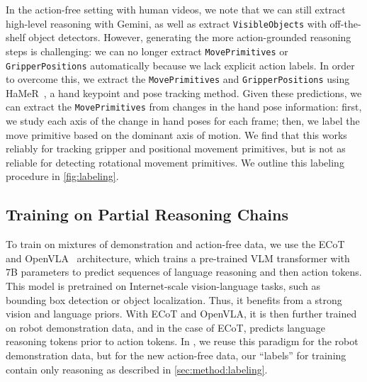 In the action-free setting with human videos, we note that we can still extract high-level reasoning with Gemini, as well as extract \texttt{VisibleObjects} with off-the-shelf object detectors. However, generating the more action-grounded reasoning steps is challenging: we can no longer extract \texttt{MovePrimitives} or \texttt{GripperPositions} automatically because we lack explicit action labels. In order to overcome this, we extract the \texttt{MovePrimitives} and \texttt{GripperPositions} using HaMeR~\cite{pavlakos2024reconstructing}, a hand keypoint and pose tracking method. Given these predictions, we can extract the \texttt{MovePrimitives} from changes in the hand pose information: first, we study each axis of the change in hand poses for each frame; then, we label the move primitive based on the dominant axis of motion. We find that this works reliably for tracking gripper and positional movement primitives, but is not as reliable for detecting rotational movement primitives.
We outline this labeling procedure in \cref{fig:labeling}.

\subsection{Training on Partial Reasoning Chains}\label{sec:method:training}

To train on mixtures of demonstration and action-free data, we use the ECoT and OpenVLA~\cite{zawalski2024robotic, kim2024openvla} architecture, which trains a pre-trained VLM transformer with 7B parameters to predict sequences of language reasoning and then action tokens. This model is pretrained on Internet-scale vision-language tasks, such as bounding box detection or object localization. Thus, it benefits from a strong vision and language priors. With ECoT and OpenVLA, it is then further trained on robot demonstration data, and in the case of ECoT, predicts language reasoning tokens prior to action tokens.
In \ACRO, we reuse this paradigm for the robot demonstration data, but for the new action-free data, our ``labels'' for training contain only reasoning as described in \cref{sec:method:labeling}.
